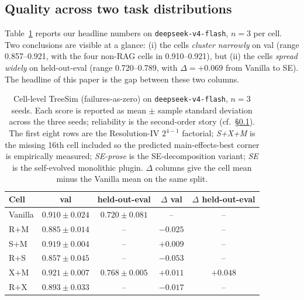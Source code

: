 \documentclass{article}
\begin{document}
\subsection{Quality across two task distributions}
\label{subsec:quality}

Table~\ref{tab:main-results} reports our headline numbers on \texttt{deepseek-v4-flash}, $n=3$ per cell. Two conclusions are visible at a glance: (i) the cells \emph{cluster narrowly} on val (range 0.857--0.921, with the four non-RAG cells in 0.910--0.921), but (ii) the cells \emph{spread widely} on held-out-eval (range 0.720--0.789, with $\Delta = +0.069$ from Vanilla to SE). The headline of this paper is the gap between these two columns.

\begin{table}[t]
  \caption{Cell-level TreeSim (failures-as-zero) on \texttt{deepseek-v4-flash}, $n=3$ seeds. Each score is reported as mean $\pm$ sample standard deviation across the three seeds; reliability is the second-order story (cf.\ \S\ref{subsec:quality}). The first eight rows are the Resolution-IV $2^{4-1}$ factorial; \emph{S+X+M} is the missing 16th cell included so the predicted main-effects-best corner is empirically measured; \emph{SE-prose} is the SE-decomposition variant; \emph{SE} is the self-evolved monolithic plugin. $\Delta$ columns give the cell mean minus the Vanilla mean on the same split.}
  \label{tab:main-results}
  \centering
  \small
  \begin{tabular}{lcccc}
    \toprule
    \textbf{Cell} & \textbf{val} & \textbf{held-out-eval} & \textbf{$\Delta$ val} & \textbf{$\Delta$ held-out-eval} \\
    \midrule
    Vanilla        & $0.910 \pm 0.024$           & $0.720 \pm 0.081$            & --                & --                \\
    R$+$M          & $0.885 \pm 0.014$           & --                           & $-0.025$          & --                \\
    S$+$M          & $0.919 \pm 0.004$           & --                           & $+0.009$          & --                \\
    R$+$S          & $0.857 \pm 0.045$           & --                           & $-0.053$          & --                \\
    X$+$M          & $\mathbf{0.921 \pm 0.007}$  & $0.768 \pm 0.005$            & $\mathbf{+0.011}$ & $+0.048$          \\
    R$+$X          & $0.893 \pm 0.033$           & --                           & $-0.017$          & --                \\

\end{tabular}
\end{table}
\end{document}

